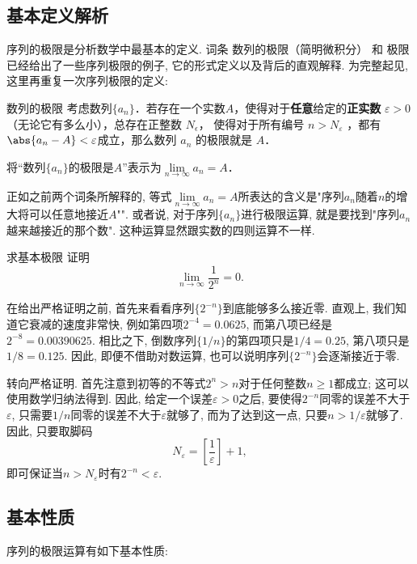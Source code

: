 

\subsection{基本定义解析}

序列的极限是分析数学中最基本的定义. 词条 数列的极限（简明微积分） 和 极限 已经给出了一些序列极限的例子, 它的形式定义以及背后的直观解释. 为完整起见, 这里再重复一次序列极限的定义:

\begin{definition}{数列的极限}
考虑数列$\{a_n\}$．若存在一个实数$A$，使得对于\textbf{任意}给定的\textbf{正实数} $\varepsilon > 0$（无论它有多么小），总存在正整数 $N_\epsilon$， 使得对于所有编号 $n>N_\varepsilon$ ，都有 $\abs{a_n - A} < \varepsilon$成立，那么数列 $a_n$ 的极限就是 $A$．

将“数列$\{a_n\}$的极限是$A$”表示为$\lim\limits_{n\to\infty}a_n=A$．
\end{definition}

正如之前两个词条所解释的, 等式$\lim\limits_{n\to\infty}a_n=A$所表达的含义是"序列$a_n$随着$n$的增大将可以任意地接近$A$"". 或者说, 对于序列$\{a_n\}$进行极限运算, 就是要找到"序列$a_n$越来越接近的那个数". 这种运算显然跟实数的四则运算不一样.

\begin{example}{求基本极限}
证明$$\lim\limits_{n\to\infty}\frac{1}{2^n}=0.$$

在给出严格证明之前, 首先来看看序列$\{2^{-n}\}$到底能够多么接近零. 直观上, 我们知道它衰减的速度非常快, 例如第四项$2^{-4}=0.0625$, 而第八项已经是$2^{-8}=0.00390625$. 相比之下, 倒数序列$\{1/n\}$的第四项只是$1/4=0.25$, 第八项只是$1/8=0.125$. 因此, 即便不借助对数运算, 也可以说明序列$\{2^{-n}\}$会逐渐接近于零.

转向严格证明. 首先注意到初等的不等式$2^n>n$对于任何整数$n\geq1$都成立; 这可以使用数学归纳法得到. 因此, 给定一个误差$\varepsilon>0$之后, 要使得$2^{-n}$同零的误差不大于$\varepsilon$, 只需要$1/n$同零的误差不大于$\varepsilon$就够了, 而为了达到这一点, 只要$n>1/\varepsilon$就够了. 因此, 只要取脚码
$$
N_\varepsilon=\left[\frac{1}{\varepsilon}\right]+1,
$$
即可保证当$n>N_\varepsilon$时有$2^{-n}<\varepsilon$.
\end{example}

\subsection{基本性质}
序列的极限运算有如下基本性质:


